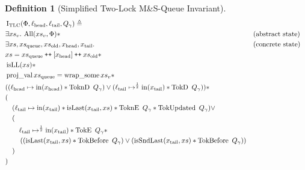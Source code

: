 \documentclass[a4paper, 10pt]{report}
\theoremstyle{definition}
\newtheorem{definition}{Definition}[section]
\newcommand{\msq}{M\&S-Queue\xspace}
\newcommand{\tlmsq}{Two-Lock \msq}
\newcommand{\TLQueueInvariantConc}{\operatorname{I_{TLC}}}
\newcommand{\xsc}{xs}
\newcommand{\xsqueue}{xs_{\mathrm{queue}}}
\newcommand{\xsold}{xs_{\mathrm{old}}}
\newcommand{\isLL}{\operatorname{isLL}}
\newcommand{\AllP}{\operatorname{All}}
\newcommand{\projval}{\operatorname{proj\_val}}
\newcommand{\wrapsome}{\operatorname{wrap\_some}}
\newcommand{\isLast}{\operatorname{isLast}}
\newcommand{\isSndLast}{\operatorname{isSndLast}}
\newcommand{\locN}[1]{\loc_{\mathrm{#1}}}
\newcommand{\lochead}{\locN{head}}
\newcommand{\loctail}{\locN{tail}}
\newcommand{\nIn}[1]{\operatorname{in}(#1)}
\newcommand{\node}{x}
\newcommand{\nodeN}[1]{\node_{\mathrm{#1}}}
\newcommand{\nodehead}{\nodeN{head}}
\newcommand{\nodetail}{\nodeN{tail}}
\newcommand{\absvalueList}{xs_v}
\newcommand{\Qg}{Q_\gname}
\newcommand{\TokE}[1]{\operatorname{TokE} ~ #1}
\newcommand{\TokEQg}{\TokE{\Qg}}
\newcommand{\ToknE}[1]{\operatorname{ToknE} ~ #1}
\newcommand{\ToknEQg}{\ToknE{\Qg}}
\newcommand{\TokD}[1]{\operatorname{TokD} ~ #1}
\newcommand{\TokDQg}{\TokD{\Qg}}
\newcommand{\ToknD}[1]{\operatorname{ToknD} ~ #1}
\newcommand{\ToknDQg}{\ToknD{\Qg}}
\newcommand{\TokBefore}[1]{\operatorname{TokBefore} ~ #1}
\newcommand{\TokBeforeQg}{\TokBefore{\Qg}}
\newcommand{\TokAfterQg}{\TokBefore{\Qg}}
\newcommand{\TokUpdated}[1]{\operatorname{TokUpdated} ~ #1}
\newcommand{\TokUpdatedQg}{\TokUpdated{\Qg}}
\newcommand\catenate{\mathbin{\text{\ttfamily\upshape ++}}}
\begin{document}
\begin{definition}[Simplified \tlmsq Invariant]\label{TLMSQ:spec:conc:invariant:simple}
  \begin{align*}
    &\TLQueueInvariantConc(\Phi, \lochead, \loctail, \Qg) \eqdef\\
    &\Exists \absvalueList. \AllP(\absvalueList, \Phi) \star &&\text{(abstract state)}\\
    &\Exists \xsc, \xsqueue, \xsold, \nodehead, \nodetail . &&\text{(concrete state)}\\
    &\xsc = \xsqueue \catenate [\nodehead] \catenate \xsold \star\\
    &\isLL(\xsc) \star\\
    &\projval \xsqueue = \wrapsome \absvalueList \star\\
    &((\lochead \mapsto \nIn{\nodehead} \star \ToknDQg) \lor (\loctail \mapsto^{\frac{1}{2}} \nIn{\nodetail} \star \TokDQg)) \star\\
    &(\\
    &\quad(\loctail \mapsto \nIn{\nodetail} \star \isLast(\nodetail, \xsc) \star \ToknEQg \star \TokUpdatedQg) \lor \\
    &\quad(\\
    &\quad\quad \loctail \mapsto^{\frac{1}{2}} \nIn{\nodetail} \star \TokEQg \star\\
    &\quad\quad\left((\isLast(\nodetail, \xsc) \star \TokBeforeQg) \lor (\isSndLast(\nodetail, \xsc) \star \TokAfterQg)\right)\\
    &\quad)\\
    &)
  \end{align*}
\end{definition}
\end{document}
